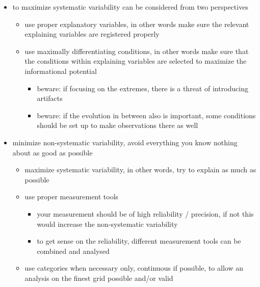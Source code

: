 \documentclass[]{article}
\providecommand{\tightlist}{%
  \setlength{\itemsep}{0pt}\setlength{\parskip}{0pt}}
\begin{document}
\begin{itemize}
\tightlist
\item
  to maximize systematic variability can be considered from two
  perspectives

  \begin{itemize}
  \tightlist
  \item
    use proper explanatory variables, in other words make sure the
    relevant explaining variables are registered properly
  \item
    use maximally differentiating conditions, in other words make sure
    that the conditions within explaining variables are selected to
    maximize the informational potential

    \begin{itemize}
    \tightlist
    \item
      beware: if focusing on the extremes, there is a threat of
      introducing artifacts
    \item
      beware: if the evolution in between also is important, some
      conditions should be set up to make observations there as well \\
    \end{itemize}
  \end{itemize}
\item
  minimize non-systematic variability, avoid everything you know nothing
  about as good as possible

  \begin{itemize}
  \tightlist
  \item
    maximize systematic variability, in other words, try to explain as
    much as possible
  \item
    use proper measurement tools

    \begin{itemize}
    \tightlist
    \item
      your measurement should be of high reliability / precision, if not
      this would increase the non-systematic variability
    \item
      to get sense on the reliability, different measurement tools can
      be combined and analysed
    \end{itemize}
  \item
    use categories when necessary only, continuous if possible, to allow
    an analysis on the finest grid possible and/or valid
  \end{itemize}
\end{itemize}
\end{document}
